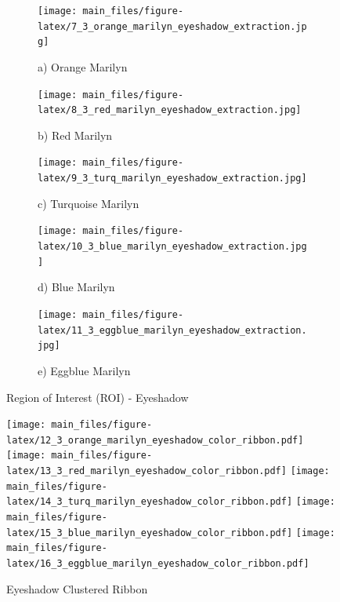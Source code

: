 \documentclass{article}
\begin{document}
\begin{figure}[htbp]
    \centering
    \begin{subfigure}[b]{0.19\textwidth}
        \texttt{[image: main\_files/figure-latex/7\_3\_orange\_marilyn\_eyeshadow\_extraction.jpg]}
        \caption*{a) Orange Marilyn}
    \end{subfigure}
    \hfill
    \begin{subfigure}[b]{0.19\textwidth}
        \texttt{[image: main\_files/figure-latex/8\_3\_red\_marilyn\_eyeshadow\_extraction.jpg]}
        \caption*{b) Red Marilyn}
    \end{subfigure}
    \hfill
    \begin{subfigure}[b]{0.19\textwidth}
        \texttt{[image: main\_files/figure-latex/9\_3\_turq\_marilyn\_eyeshadow\_extraction.jpg]}
        \caption*{c) Turquoise Marilyn}
    \end{subfigure}
    \hfill
    \begin{subfigure}[b]{0.19\textwidth}
        \texttt{[image: main\_files/figure-latex/10\_3\_blue\_marilyn\_eyeshadow\_extraction.jpg]}
        \caption*{d) Blue Marilyn}
    \end{subfigure}
    \hfill
    \begin{subfigure}[b]{0.19\textwidth}
        \texttt{[image: main\_files/figure-latex/11\_3\_eggblue\_marilyn\_eyeshadow\_extraction.jpg]}
        \caption*{e) Eggblue Marilyn}
    \end{subfigure}
    
    \caption{Region of Interest (ROI) - Eyeshadow}
\end{figure}

\begin{figure}[htbp]
    \centering
        {\texttt{[image: main\_files/figure-latex/12\_3\_orange\_marilyn\_eyeshadow\_color\_ribbon.pdf]}}
        {\texttt{[image: main\_files/figure-latex/13\_3\_red\_marilyn\_eyeshadow\_color\_ribbon.pdf]}}
        {\texttt{[image: main\_files/figure-latex/14\_3\_turq\_marilyn\_eyeshadow\_color\_ribbon.pdf]}}
        {\texttt{[image: main\_files/figure-latex/15\_3\_blue\_marilyn\_eyeshadow\_color\_ribbon.pdf]}}
        {\texttt{[image: main\_files/figure-latex/16\_3\_eggblue\_marilyn\_eyeshadow\_color\_ribbon.pdf]}}
    \caption{Eyeshadow Clustered Ribbon}
\end{figure}
\end{document}
